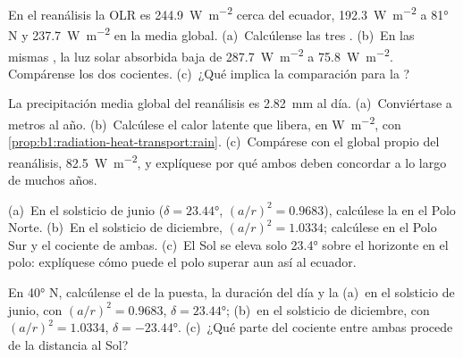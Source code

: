 \begin{exercise}[$\star$]\label{exo:b1:radiation-heat-transport:3}
En el reanálisis la OLR es \qty{244.9}{W.m^{-2}} cerca del ecuador,
\qty{192.3}{W.m^{-2}} a \ang{81} N y \qty{237.7}{W.m^{-2}} en la media global. (a)~Calcúlense las tres . (b)~En las mismas , la luz solar absorbida baja de \qty{287.7}{W.m^{-2}} a \qty{75.8}{W.m^{-2}}. Compárense los dos cocientes. (c)~¿Qué implica la comparación para la ?
\end{exercise}

\begin{exercise}[$\star$]\label{exo:b1:radiation-heat-transport:4}
La precipitación media global del reanálisis es \qty{2.82}{mm} al día. (a)~Conviértase a metros al año. (b)~Calcúlese el calor latente que libera, en \unit{W.m^{-2}}, con
\cref{prop:b1:radiation-heat-transport:rain}. (c)~Compárese con el  global propio del reanálisis, \qty{82.5}{W.m^{-2}}, y explíquese por qué ambos deben concordar a lo largo de muchos años.
\end{exercise}

\begin{exercise}[$\star\star$]\label{exo:b1:radiation-heat-transport:5}
(a)~En el solsticio de junio ($\delta = \ang{23.44}$, $(a/r)^2 = 0.9683$), calcúlese la  en el Polo Norte. (b)~En el solsticio de diciembre, $(a/r)^2 =
1.0334$; calcúlese en el Polo Sur y el cociente de ambas. (c)~El Sol se eleva solo \ang{23.4} sobre el horizonte en el polo: explíquese cómo puede el polo superar aun así al ecuador.
\end{exercise}

\begin{exercise}[$\star\star$]\label{exo:b1:radiation-heat-transport:6}
En \ang{40} N, calcúlense el  de la puesta, la duración del día y la  (a)~en el solsticio de junio, con $(a/r)^2 = 0.9683$, $\delta =
\ang{23.44}$; (b)~en el solsticio de diciembre, con $(a/r)^2 = 1.0334$, $\delta =
\ang{-23.44}$. (c)~¿Qué parte del cociente entre ambas procede de la distancia al Sol?
\end{exercise}


